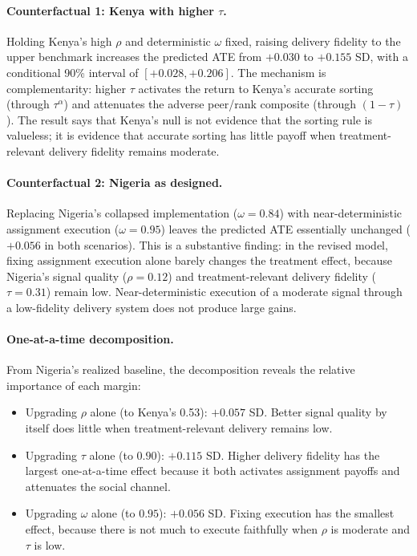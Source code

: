 \documentclass[11pt]{article}
\begin{document}


\paragraph{Counterfactual 1: Kenya with higher $\tau$.} Holding Kenya's high $\rho$ and deterministic $\omega$ fixed, raising delivery fidelity to the upper benchmark increases the predicted ATE from $+0.030$ to $+0.155$ SD, with a conditional 90\% interval of $[+0.028,+0.206]$. The mechanism is complementarity: higher $\tau$ activates the return to Kenya's accurate sorting (through $\tau^\alpha$) and attenuates the adverse peer/rank composite (through $(1-\tau)$). The result says that Kenya's null is not evidence that the sorting rule is valueless; it is evidence that accurate sorting has little payoff when treatment-relevant delivery fidelity remains moderate.

\paragraph{Counterfactual 2: Nigeria as designed.} Replacing Nigeria's collapsed implementation ($\omega = 0.84$) with near-deterministic assignment execution ($\omega = 0.95$) leaves the predicted ATE essentially unchanged ($+0.056$ in both scenarios). This is a substantive finding: in the revised model, fixing assignment execution alone barely changes the treatment effect, because Nigeria's signal quality ($\rho = 0.12$) and treatment-relevant delivery fidelity ($\tau = 0.31$) remain low. Near-deterministic execution of a moderate signal through a low-fidelity delivery system does not produce large gains.

\paragraph{One-at-a-time decomposition.} From Nigeria's realized baseline, the decomposition reveals the relative importance of each margin:
\begin{itemize}
\item Upgrading $\rho$ alone (to Kenya's 0.53): $+0.057$ SD. Better signal quality by itself does little when treatment-relevant delivery remains low.
\item Upgrading $\tau$ alone (to $0.90$): $+0.115$ SD. Higher delivery fidelity has the largest one-at-a-time effect because it both activates assignment payoffs and attenuates the social channel.
\item Upgrading $\omega$ alone (to $0.95$): $+0.056$ SD. Fixing execution has the smallest effect, because there is not much to execute faithfully when $\rho$ is moderate and $\tau$ is low.
\end{itemize}
\end{document}
